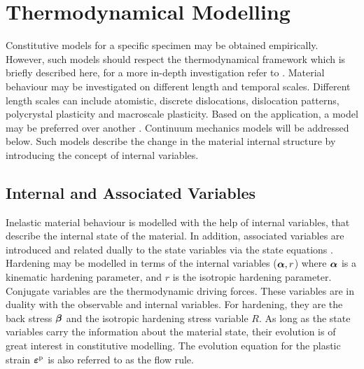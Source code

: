 \section{Thermodynamical Modelling}
\label{sec:GSM}

Constitutive models for a specific specimen may be obtained empirically. However, such models should respect the thermodynamical framework which is briefly described here, for a more in-depth investigation refer to \parencite{lemaitre1994mechanics,de2011computational}. Material behaviour may be investigated on different length and temporal scales. Different length scales can include atomistic, discrete dislocations, dislocation patterns, polycrystal plasticity and macroscale plasticity. Based on the application, a model may be preferred over another \parencite{cazacu2013multiscale,mcdowell2008viscoplasticity}. Continuum mechanics models will be addressed below. Such models describe the change in the material internal structure by introducing the concept of internal variables.

\subsection{Internal and Associated Variables}

Inelastic material behaviour is modelled with the help of internal variables, that describe the internal state of the material. In addition, associated variables are introduced and related dually to the state variables via the state equations \parencite{lemaitre1994mechanics}. Hardening may be modelled in terms of the internal variables ($\mbox{$\bm \alpha$},r$) where $\mbox{$\bm \alpha$}$ is a kinematic hardening parameter, and $r$ is the isotropic hardening parameter. Conjugate variables are the thermodynamic driving forces. These variables are in duality with the observable and internal variables. For hardening, they are the back stress $\mbox{$\bm \beta$}$ and the isotropic hardening stress variable $R$. As long as the state variables carry the information about the material state, their evolution is of great interest in constitutive modelling. The evolution equation for the plastic strain $\mbox{$\bm \varepsilon $}^{\rm p}$ is also referred to as the flow rule.

